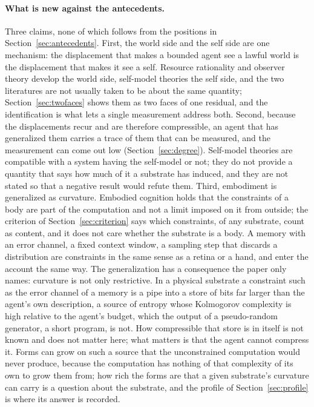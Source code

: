 \paragraph{What is new against the antecedents.}
\label{sec:contribution}
Three claims, none of which follows from the positions in Section~\ref{sec:antecedents}. First, the
world side and the self side are one mechanism: the displacement that makes a bounded agent see a
lawful world is the displacement that makes it see a self. Resource rationality and observer theory
develop the world side, self-model theories the self side, and the two literatures are not usually
taken to be about the same quantity; Section~\ref{sec:twofaces} shows them as two faces of one
residual, and the identification is what lets a single measurement address both. Second, because the
displacements recur and are therefore compressible, an agent that has generalized them carries a trace
of them that can be measured, and the measurement can come out low (Section~\ref{sec:degree}).
Self-model theories are compatible with a system having the self-model or not; they do not provide a
quantity that says how much of it a substrate has induced, and they are not stated so that a negative
result would refute them. Third, embodiment is generalized as curvature. Embodied cognition holds that
the constraints of a body are part of the computation and not a limit imposed on it from outside; the
criterion of Section~\ref{sec:criterion} says which constraints, of any substrate, count as content,
and it does not care whether the substrate is a body. A memory with an error channel, a fixed context
window, a sampling step that discards a distribution are constraints in the same sense as a retina or
a hand, and enter the account the same way. The generalization has a consequence the paper only
names: curvature is not only restrictive. In a physical substrate a constraint such as the error channel
of a memory is a pipe into a store of bits far larger than the agent's own description, a source of
entropy whose Kolmogorov complexity is high relative to the agent's budget, which the output of a
pseudo-random generator, a short program, is not. How compressible that store is in itself is not known
and does not matter here; what matters is that the agent cannot compress it. Forms can grow on such a
source that the unconstrained computation would never produce, because the computation has nothing of
that complexity of its own to grow them from; how rich the forms are that a given substrate's
curvature can carry is a question about the substrate, and the profile of Section~\ref{sec:profile} is
where its answer is recorded.

